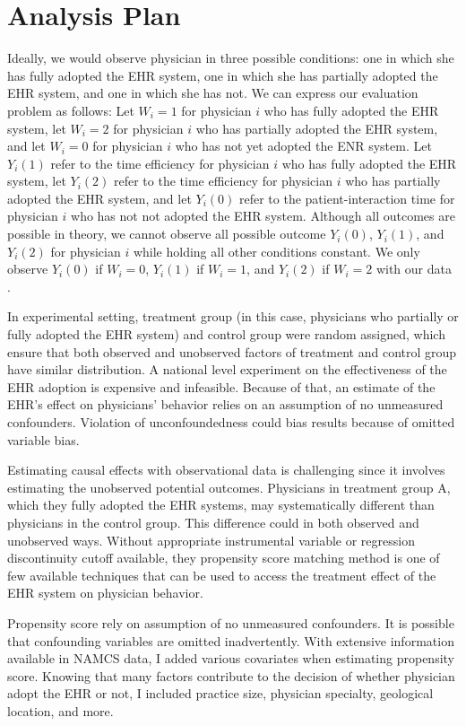 \section{Analysis Plan}
Ideally, we would observe physician in three possible conditions: one in which she has fully adopted the EHR system, one in which she has partially adopted the EHR system, and one in which she has not. We can express our evaluation problem as follows: Let $W_i = 1$ for physician $i$ who has fully adopted the EHR system, let $W_i = 2$ for physician $i$ who has partially adopted the EHR system, and let $W_i = 0$ for physician $i$ who has not yet adopted the ENR system. Let $Y_i(1)$ refer to the time efficiency for physician $i$ who has fully adopted the EHR system, let $Y_i(2)$ refer to the time efficiency for physician $i$ who has partially adopted the EHR system, and let $Y_i(0)$ refer to the patient-interaction time for physician $i$ who has not not adopted the EHR system. Although all outcomes are possible in theory, we cannot observe all possible outcome $Y_i(0)$, $Y_i(1)$, and $Y_i(2)$ for physician $i$ while holding all other conditions constant. We only observe $Y_i(0)$ if $W_i = 0$, $Y_i(1)$ if $W_i = 1$, and $Y_i(2)$ if $W_i = 2$ with our data \citep{imbens2008recent}.

In experimental setting, treatment group (in this case, physicians who partially or fully adopted the EHR system) and control group were random assigned, which ensure that both observed and unobserved factors of treatment and control group have similar distribution. A national level experiment on the effectiveness of the EHR adoption is expensive and infeasible. Because of that, an estimate of the EHR's effect on physicians' behavior relies on an assumption of no unmeasured confounders. Violation of unconfoundedness could bias results because of omitted variable bias.

Estimating causal effects with observational data is challenging since it involves estimating the unobserved potential outcomes. Physicians in treatment group A, which they fully adopted the EHR systems, may systematically different than physicians in the control group. This difference could in both observed and unobserved ways. Without appropriate instrumental variable or regression discontinuity cutoff available, they propensity score matching method is one of few available techniques that can be used to access the treatment effect of the EHR system on physician behavior.

Propensity score rely on assumption of no unmeasured confounders. It is possible that confounding variables are omitted inadvertently. With extensive information available in NAMCS data, I added various covariates when estimating propensity score. Knowing that many factors contribute to the decision of whether physician adopt the EHR or not, I included practice size, physician specialty, geological location, and more. 

